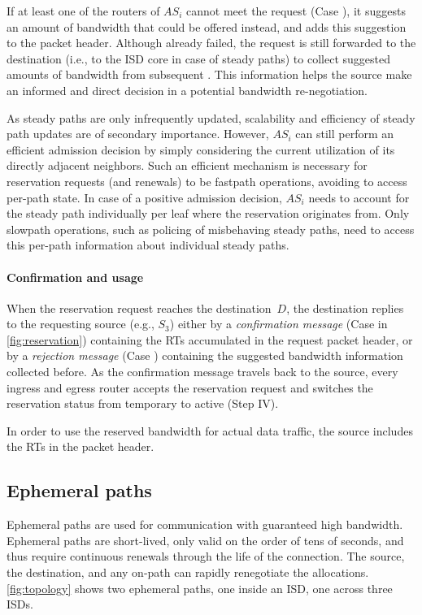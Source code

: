 If at least one of the routers of $AS_i$ cannot meet the request
(Case ), it suggests an amount of bandwidth that could be
offered instead, and adds this suggestion to the packet header.
Although already failed, the request is still forwarded to the
destination (i.e., to the ISD core in case of steady paths) to collect
suggested amounts of bandwidth from subsequent
\ADs. This information helps the source make an informed and direct
decision in a potential bandwidth re-negotiation.

As steady paths are only infrequently updated, scalability and
efficiency of steady path updates are of secondary importance.
However, $AS_i$ can still perform an efficient admission decision by
simply considering the current utilization of its directly adjacent
\AD neighbors.
Such an efficient mechanism is necessary for reservation requests (and
renewals) to be fastpath operations, avoiding to access per-path state.
In case of a positive admission decision, $AS_i$ needs to account for
the steady path individually per leaf \AD where the reservation
originates from. Only slowpath operations, such as policing of
misbehaving steady paths, need to access this per-path information
about individual steady paths.

\paragraph{Confirmation and usage} When the reservation request reaches the
destination~$D$, the destination replies to the requesting source (e.g., $S_3$)
either by a \textit{confirmation message} (Case  in
\autoref{fig:reservation}) containing the RTs accumulated in the request packet
header, or by a \textit{rejection message} (Case ) containing the
suggested bandwidth information collected before. As
the confirmation message travels back to the source, every ingress and egress
router accepts the reservation request and switches the reservation status from
temporary to active (Step IV).

In order to use the reserved bandwidth for actual data traffic, the
source includes the RTs in the packet header.


\subsection{Ephemeral paths}
\label{sec:ephemeral}

\noindent Ephemeral paths are used for communication with guaranteed high
bandwidth. Ephemeral paths are short-lived, only valid on the order of tens of
seconds, and thus require continuous renewals through the life of the connection.
The source, the destination, and any on-path \AD can rapidly renegotiate the
allocations. \autoref{fig:topology} shows two ephemeral paths, one inside an
ISD, one across three ISDs.

